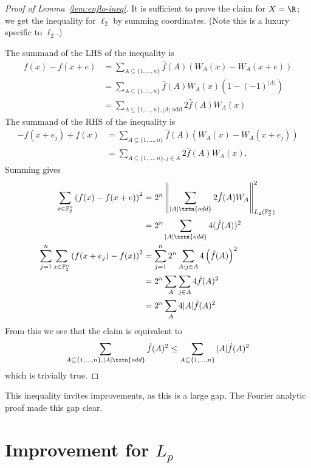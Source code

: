 \begin{proof}[Proof of Lemma~\ref{lem:enflo-ineq}]
It is sufficient to prove the claim for $X=\R$; we get the inequality for $\ell_2$ by summing coordinates. (Note this is a luxury specific to $\ell_2$.)

The summand of the LHS of the inequality is
\begin{align*}
f(x) - f(x + e) &= \sum_{A \subseteq \{1, \ldots, n\}} \hat{f}(A)\left(W_A(x) - W_A(x + e)\right)\\
&=\sum_{A \subseteq \{1, \ldots, n\}} \hat{f}(A)W_A(x)\left(1 - (-1)^{|A|}\right) \\
&= \sum_{A \subseteq \{1, \ldots, n\}, |A| \text{ odd}} 2\hat{f}(A)W_A(x)
\end{align*}
The summand of the RHS of the inequality is
\begin{align*}
-f(x + e_j) + f(x) &= \sum_{A \subseteq \{1, \ldots, n\}} \hat{f}(A)(W_A(x) - W_A(x + e_j))\\
& = \sum_{A \subseteq \{1, \ldots, n\}, j \in A} 2\hat{f}(A)W_A(x).
\end{align*}
Summing gives
\begin{align*}
\sum_{x \in \mathbb{F}_2^n}\left(f(x) - f(x + e)\right)^2 &= 2^n \left\|\sum_{|A| \txtn{ odd}} 2\hat{f}(A)W_A\right\|_{L_2(\mathbb{F}_2^n)}^2 \\
&= 2^n \sum_{|A| \txtn{ odd}} 4(\hat{f}(A))^2\\
\sum_{j = 1}^n \sum_{x \in \mathbb{F}_2^n} \left(f(x + e_j) - f(x)\right)^2 &= \sum_{j = 1}^n 2^n \sum_{A: j \in A} 4\left(\hat{f}(A)\right)^2\\
&= 2^n \sum_A \sum_{j \in A} 4\hat{f}(A)^2 \\
&= 2^n\sum_{A} 4|A|\hat{f}(A)^2
\end{align*}
From this we see that the claim is equivalent to
\[
\sum_{A \subseteq \{1, \ldots, n\}, |A| \txtn{ odd}} \hat{f}(A)^2 \leq \sum_{A \subseteq \{1, \ldots, n\}}|A|\hat{f}(A)^2
\]
which is trivially true. 
\end{proof}
This inequality invites improvements, as this is a large gap. The Fourier analytic proof made this gap clear.



\section{Improvement for $L_p$}



